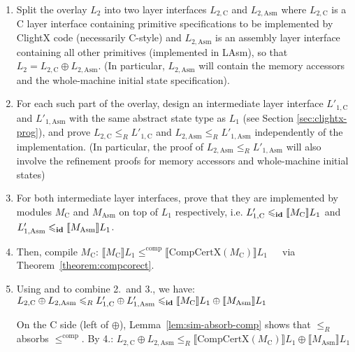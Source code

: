 \begin{enumerate}   
\item Split the overlay $L_2$ into two layer interfaces
  $L_{2, \text{C}}$ and $L_{2, \text{Asm}}$ where $L_{2, \text{C}}$ is a C layer interface
  containing primitive specifications to be implemented by
  ClightX code (necessarily C-style) and $L_{2, \text{Asm}}$ is an assembly layer interface
  containing all other primitives (implemented in LAsm), so that $L_2 = L_{2, \text{C}} \oplus
  L_{2, \text{Asm}}$. (In particular, $L_{2, \text{Asm}}$ will contain the
  memory accessors and the whole-machine initial state specification).
\item For each such part of the overlay, design an intermediate layer interface
  $L'_{1, \text{C}}$ and $L'_{1, \text{Asm}}$ with the same abstract state type as
  $L_1$ (see Section \ref{sec:clightx-prog}), and
  prove $L_{2, \text{C}} \leqslant_R L'_{1, \text{C}}$ and $L_{2, \text{Asm}} \leqslant_R
  L'_{1, \text{Asm}}$ independently of the implementation. (In
  particular, the proof of $L_{2, \text{Asm}} \leqslant_R
  L'_{1, \text{Asm}}$ will also involve the refinement proofs for memory
  accessors and whole-machine initial states)
\item For both intermediate layer interfaces, prove that they are implemented by
  modules $M_\text{C}$ and $M_\text{Asm}$ on top of
  $L_1$ respectively, i.e.  $L'_{1, \text{C}} \leqslant_{\textbf{id}} \llbracket M_\text{C} \rrbracket L_1$ and
  $L'_{1,\text{Asm}} \leqslant_{\textbf{id}} \llbracket M_{\text{Asm}} \rrbracket L_1$.
\item Then, compile $M_\text{C}$:
$\llbracket M_\text{C}
  \rrbracket L_1 \leqslant^{\textrm{comp}} \llbracket
  \textrm{CompCertX}(M_\text{C}) \rrbracket L_1$~~~via Theorem~\ref{theorem:compcorect}.

\item
Using  and  to combine 2.\ and 3., we have:
$
L_{2, \text{C}} \oplus L_{2, \text{Asm}}
\leqslant_R
  L'_{1, \text{C}} \oplus L'_{1, \text{Asm}}
\leqslant_{\textbf{id}}
  \llbracket M_\text{C} \rrbracket L_1 \oplus
  \llbracket M_{\text{Asm}} \rrbracket L_1
$

On the C side (left of $\oplus$), Lemma~\ref{lem:sim-absorb-comp} shows that
$\leqslant_R$ absorbs $\leqslant^{\textrm{comp}}$.  By 4.:
$
L_{2, \text{C}} \oplus L_{2, \text{Asm}} \leqslant_R
  \llbracket \textrm{CompCertX}(M_\text{C}) \rrbracket L_1 \oplus 
  \llbracket M_{\text{Asm}} \rrbracket L_1
$


\end{enumerate}
